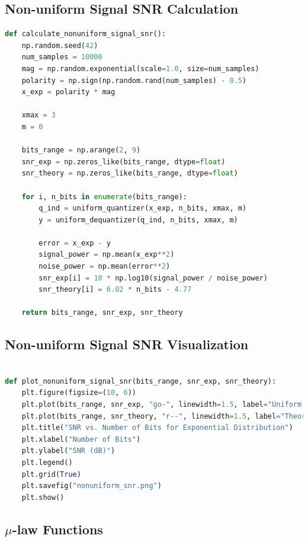 \documentclass{article}
\begin{document}
\subsection{Non-uniform Signal SNR Calculation}

\begin{lstlisting}[language=Python, caption=Non-uniform Signal SNR Calculation]
def calculate_nonuniform_signal_snr():
    np.random.seed(42)
    num_samples = 10000
    mag = np.random.exponential(scale=1.0, size=num_samples)
    polarity = np.sign(np.random.rand(num_samples) - 0.5)
    x_exp = polarity * mag

    xmax = 3
    m = 0

    bits_range = np.arange(2, 9)
    snr_exp = np.zeros_like(bits_range, dtype=float)
    snr_theory = np.zeros_like(bits_range, dtype=float)

    for i, n_bits in enumerate(bits_range):
        q_ind = uniform_quantizer(x_exp, n_bits, xmax, m)
        y = uniform_dequantizer(q_ind, n_bits, xmax, m)

        error = x_exp - y
        signal_power = np.mean(x_exp**2)
        noise_power = np.mean(error**2)
        snr_exp[i] = 10 * np.log10(signal_power / noise_power)
        snr_theory[i] = 6.02 * n_bits - 4.77
        
    return bits_range, snr_exp, snr_theory
\end{lstlisting}

\subsection{Non-uniform Signal SNR Visualization}

\begin{lstlisting}[language=Python, caption=Non-uniform Signal SNR Visualization]

def plot_nonuniform_signal_snr(bits_range, snr_exp, snr_theory):
    plt.figure(figsize=(10, 6))
    plt.plot(bits_range, snr_exp, "go-", linewidth=1.5, label="Uniform Quantizer")
    plt.plot(bits_range, snr_theory, "r--", linewidth=1.5, label="Theoretical SNR")
    plt.title("SNR vs. Number of Bits for Exponential Distribution")
    plt.xlabel("Number of Bits")
    plt.ylabel("SNR (dB)")
    plt.legend()
    plt.grid(True)
    plt.savefig("nonuniform_snr.png")
    plt.show()
\end{lstlisting}

\subsection{$\mu$-law  Functions}
\end{document}
